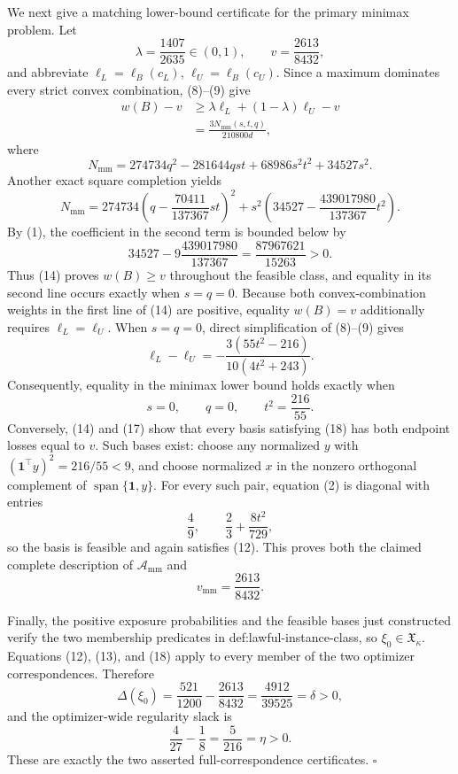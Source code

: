 We next give a matching lower-bound certificate for the primary minimax problem.  Let
\[
 \lambda=\frac{1407}{2635}\in(0,1),
 \qquad
 v=\frac{2613}{8432},
\]
and abbreviate \(\ell_L=\ell_B(c_L)\), \(\ell_U=\ell_B(c_U)\).  Since a maximum dominates every strict convex combination, (8)--(9) give
\[
 \begin{split}
 w(B)-v
 &\ge \lambda\ell_L+(1-\lambda)\ell_U-v\\
 &=\frac{3N_{\mathrm{mm}}(s,t,q)}{210800d},
 \end{split}
 \tag{14}
\]
where
\[
 N_{\mathrm{mm}}
 =274734q^2-281644qst+68986s^2t^2+34527s^2.
\]
Another exact square completion yields
\[
 N_{\mathrm{mm}}
 =274734\left(q-\frac{70411}{137367}st\right)^2
 +s^2\left(34527-\frac{439017980}{137367}t^2\right).
 \tag{15}
\]
By (1), the coefficient in the second term is bounded below by
\[
 34527-9\frac{439017980}{137367}
 =\frac{87967621}{15263}>0.
 \tag{16}
\]
Thus (14) proves \(w(B)\ge v\) throughout the feasible class, and equality in its second line occurs exactly when \(s=q=0\).  Because both convex-combination weights in the first line of (14) are positive, equality \(w(B)=v\) additionally requires \(\ell_L=\ell_U\).  When \(s=q=0\), direct simplification of (8)--(9) gives
\[
 \ell_L-\ell_U
 =-\frac{3(55t^2-216)}{10(4t^2+243)}.
 \tag{17}
\]
Consequently, equality in the minimax lower bound holds exactly when
\[
 s=0,
 \qquad q=0,
 \qquad t^2=\frac{216}{55}.
 \tag{18}
\]
Conversely, (14) and (17) show that every basis satisfying (18) has both endpoint losses equal to \(v\).  Such bases exist: choose any normalized \(y\) with \((\mathbf1^{\top}y)^2=216/55<9\), and choose normalized \(x\) in the nonzero orthogonal complement of \(\operatorname{span}\{\mathbf1,y\}\).  For every such pair, equation (2) is diagonal with entries
\[
 \frac49,
 \qquad \frac23+\frac{8t^2}{729},
\]
so the basis is feasible and again satisfies (12).  This proves both the claimed complete description of \(\mathcal A_{\mathrm{mm}}\) and
\[
 v_{\mathrm{mm}}=\frac{2613}{8432}.
\]

Finally, the positive exposure probabilities and the feasible bases just constructed verify the two membership predicates in def:lawful-instance-class, so \(\xi_0\in\mathfrak X_\kappa\).  Equations (12), (13), and (18) apply to every member of the two optimizer correspondences.  Therefore
\[
 \Delta(\xi_0)
 =\frac{521}{1200}-\frac{2613}{8432}
 =\frac{4912}{39525}=\delta>0,
\]
and the optimizer-wide regularity slack is
\[
 \frac4{27}-\frac18=\frac5{216}=\eta>0.
\]
These are exactly the two asserted full-correspondence certificates. \(\square\)